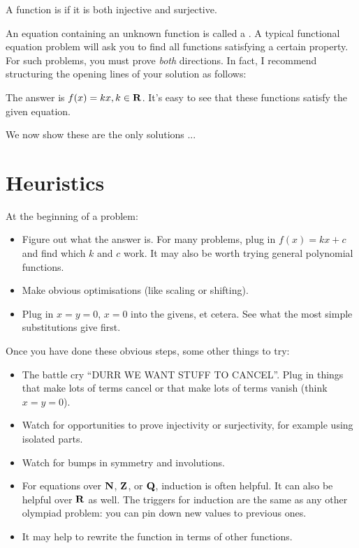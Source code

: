 \begin{definition}[Bijectivity]
A function is  if it is both injective and surjective.
\end{definition}

An equation containing an unknown function is called a . A typical functional equation problem will ask you to find all functions satisfying a certain property. For such problems, you must prove \emph{both} directions. In fact, I recommend structuring the opening lines of your solution as follows:

\begin{solution}
The answer is $f(x)=kx, k\in\mathbf R$. It's easy to see that these functions satisfy the given equation.

We now show these are the only solutions ...
\end{solution}

\section{Heuristics}
At the beginning of a problem:
\begin{itemize}
\item Figure out what the answer is. For many problems, plug in $f(x)=kx+c$ and find which $k$ and $c$ work. It may also be worth trying general polynomial functions.
\item Make obvious optimisations (like scaling or shifting).
\item Plug in $x=y=0$, $x=0$ into the givens, et cetera. See what the most simple substitutions give first.
\end{itemize}

Once you have done these obvious steps, some other things to try:
\begin{itemize}
\item The battle cry “DURR WE WANT STUFF TO CANCEL”. Plug in things that make lots of terms cancel or that make lots of terms vanish (think $x=y=0$).
\item Watch for opportunities to prove injectivity or surjectivity, for example using isolated parts.
\item Watch for bumps in symmetry and involutions.
\item For equations over $\mathbf N$, $\mathbf Z$, or $\mathbf Q$, induction is often helpful. It can also be helpful over $\mathbf R$ as well. The triggers for induction are the same as any other olympiad problem: you can pin down new values to previous ones.
\item It may help to rewrite the function in terms of other functions.
\end{itemize}

